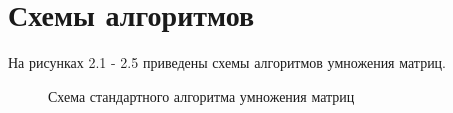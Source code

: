 \documentclass[12pt,a4paper]{report}
\begin{document}
\section{Схемы алгоритмов}

На рисунках 2.1 - 2.5 приведены схемы алгоритмов умножения матриц.

\begin{figure}[h]
    \caption{Схема стандартного алгоритма умножения матриц}
    \label{fig:image}
\end{figure}
\end{document}
